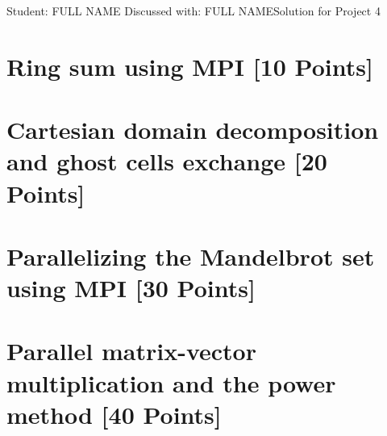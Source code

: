\documentclass[unicode,11pt,a4paper,oneside,numbers=endperiod,openany]{scrartcl}
\begin{document}
\setassignment
{}

{Student: FULL NAME}
{Discussed with: FULL NAME}{Solution for Project 4}{}
\newline


\section{Ring sum using MPI [10 Points]}

\section{Cartesian domain decomposition and ghost cells exchange [20 Points]}

\section{Parallelizing the Mandelbrot set using MPI [30 Points]}

\section{Parallel matrix-vector multiplication and the power method
      [40 Points]}
\end{document}
